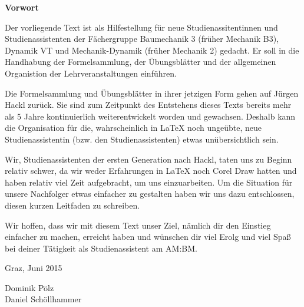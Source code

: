 
{\huge \textbf{Vorwort}}\\
\vspace{8mm}

Der vorliegende Text ist als Hilfestellung für neue Studienassitentinnen und
Studienassistenten der Fächergruppe Baumechanik 3 (früher Mechanik B3), Dynamik
VT und Mechanik-Dynamik (früher Mechanik 2) gedacht. Er soll in die Handhabung
der Formelsammlung, der Übungsblätter und der allgemeinen Organistion der 
Lehrveranstaltungen einführen.

Die Formelsammlung und Übungsblätter in ihrer jetzigen Form gehen auf
Jürgen Hackl %
zurück. Sie sind zum Zeitpunkt des Entstehens
dieses Texts bereits mehr als 5 Jahre kontinuierlich weiterentwickelt worden und
gewachsen. Deshalb kann die Organisation für die, wahrscheinlich in \LaTeX{}
noch ungeübte, neue Studienassistentin (bzw. den Studienassistenten) etwas 
unübersichtlich sein.

Wir, Studienassistenten der ersten \glqq{}Generation\grqq{} nach Hackl, taten
uns zu Beginn relativ schwer, da wir weder Erfahrungen in \LaTeX{} noch Corel
Draw hatten und haben relativ viel Zeit aufgebracht, um uns einzuarbeiten.
Um die Situation für unsere Nachfolger etwas einfacher zu gestalten haben wir
uns dazu entschlossen, diesen kurzen Leitfaden zu schreiben.

Wir hoffen, dass wir mit diesem Text unser Ziel, nämlich dir den Einstieg
einfacher zu machen, erreicht haben und wünschen dir viel Erolg und viel Spaß
bei deiner Tätigkeit als Studienassistent am AM:BM.

\begin{flushleft}
Graz, Juni 2015 
\end{flushleft}
\begin{flushright}
Dominik Pölz\\Daniel Schöllhammer
\end{flushright}

